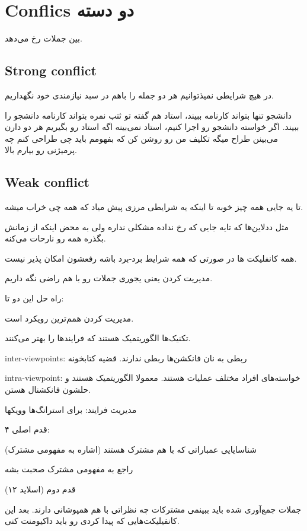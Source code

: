 \section{Conflics دو دسته}

بین جملات رخ می‌دهد. 

\subsection{Strong conflict}

در هیچ شرایطی نمیذتوانیم هر دو جمله را باهم در سبد نیازمندی خود نگهداریم.

دانشجو تنها بتواند کارنامه ببیند، استاد هم گفته تو ثتب نمره بتواند کارنامه
دانشجو را ببیند. اگر خواسته دانشجو رو اجرا کنیم، استاد نمی‌بینه
اگه استاد رو بگیریم هر دو دارن می‌بینن
طراح میگه تکلیف من رو روشن کن که بفهومم باید چی طراحی کنم
چه پرمیژنی رو بیارم بالا.

\subsection{Weak conflict}

تا یه جایی همه چیز خوبه
تا اینکه یه شرایطی مرزی پیش میاد که همه چی خراب میشه.

مثل ددلاین‌ها که تایه جایی که رخ نداده مشکلی نداره ولی به محض اینکه از زمانش
بگذره همه رو نارحات می‌کنه.

همه کانفلیکت ها در صورتی که همه شرایط برد-برد باشه رفعشون امکان پذیر نیست.

مدیریت کردن یعنی یجوری جملات رو با هم راضی نگه داریم.


راه حل این دو تا:

مدیریت کردن همم‌ترین رویکرد است.

تکنیک‌ها الگوریتمیک هستند که فرایند‌ها را بهتر می‌کنند.

inter-viewpoints: ربطی به نان فانکشن‌ها ربطی ندارند. قضیه کتابخونه

intra-viewpoint: خواسته‌های افراد مختلف عملیات هستند. معمولا الگوریتمیک هستند و
حلشون فانکشنال هستن.


مدیریت فرایند:
برای استرانگ‌ها وویکها 

۴ قدم اصلی:

شناسایایی عمباراتی که با هم مشترک هستند (اشاره به مفهومی مشترک)

راجع به مفهومی مشترک صحبت بشه

قدم دوم (اسلاید ۱۲)

جملات جمع‌آوری شده
باید ببینمی مشترکات چه نظراتی با هم همپوشانی دارند.
بعد این کانفیلیکت‌هایی که پیدا کردی رو باید داکیومنت کنی.

